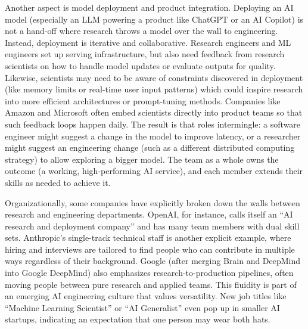 \documentclass[pdflatex,sn-mathphys-num]{sn-jnl}%
\theoremstyle{thmstyleone}%
\theoremstyle{thmstyletwo}%
\theoremstyle{thmstylethree}%
\begin{document}
Another aspect is model deployment and product integration. Deploying an AI model (especially an LLM powering a product like ChatGPT or an AI Copilot) is not a hand-off where research throws a model over the wall to engineering. Instead, deployment is iterative and collaborative. Research engineers and ML engineers set up serving infrastructure, but also need feedback from research scientists on how to handle model updates or evaluate outputs for quality. Likewise, scientists may need to be aware of constraints discovered in deployment (like memory limits or real-time user input patterns) which could inspire research into more efficient architectures or prompt-tuning methods. Companies like Amazon and Microsoft often embed scientists directly into product teams so that such feedback loops happen daily. The result is that roles intermingle: a software engineer might suggest a change in the model to improve latency, or a researcher might suggest an engineering change (such as a different distributed computing strategy) to allow exploring a bigger model. The team as a whole owns the outcome (a working, high-performing AI service), and each member extends their skills as needed to achieve it.

Organizationally, some companies have explicitly broken down the walls between research and engineering departments. OpenAI, for instance, calls itself an “AI research and deployment company” and has many team members with dual skill sets. Anthropic’s single-track technical staff is another explicit example, where hiring and interviews are tailored to find people who can contribute in multiple ways regardless of their background. Google (after merging Brain and DeepMind into Google DeepMind) also emphasizes research-to-production pipelines, often moving people between pure research and applied teams. This fluidity is part of an emerging AI engineering culture that values versatility. New job titles like “Machine Learning Scientist” or “AI Generalist” even pop up in smaller AI startups, indicating an expectation that one person may wear both hats.
\end{document}
